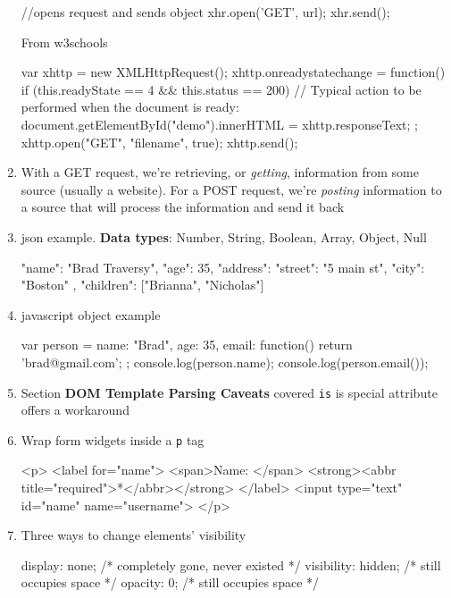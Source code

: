 \documentclass[a4paper,12pt]{article}
\begin{document}
\begin{enumerate}
\begin{jscode}
//opens request and sends object
xhr.open('GET', url);
xhr.send();
\end{jscode}
From w3schools
\begin{jscode}
var xhttp = new XMLHttpRequest();
xhttp.onreadystatechange = function() {
    if (this.readyState == 4 && this.status == 200) {
       // Typical action to be performed when the document is ready:
       document.getElementById("demo").innerHTML = xhttp.responseText;
    }
};
xhttp.open("GET", "filename", true);
xhttp.send();
\end{jscode}

\item With a GET request, we're retrieving, or \textit{getting}, information from some source (usually a website). For a POST request, we're \textit{posting} information to a source that will process the information and send it back

\item json example. \textbf{Data types}: Number, String, Boolean, Array, Object, Null
\begin{jscode}
{
	"name": "Brad Traversy",
	"age": 35,
	"address": {
		"street": "5 main st",
		"city": "Boston"
	},
	"children": ["Brianna", "Nicholas"]
}
\end{jscode}

\item javascript object example
\begin{jscode}
var person = {
  name: "Brad",
  age: 35,
  email: function(){
    return 'brad@gmail.com';
  }
};
console.log(person.name);
console.log(person.email());
\end{jscode}

\item Section \textbf{DOM Template Parsing Caveats} covered \verb|is| is special attribute offers a workaround

\item Wrap form widgets inside a \verb|p| tag
\begin{htmlcode}
<p>
  <label for="name">
    <span>Name: </span>
    <strong><abbr title="required">*</abbr></strong>
  </label>
  <input type="text" id="name" name="username">
</p>
\end{htmlcode}

\item Three ways to change elements' visibility
\begin{htmlcode}
display: none; /* completely gone, never existed */
visibility: hidden; /* still occupies space */
opacity: 0; /* still occupies space */
\end{htmlcode}


\end{enumerate}
\end{document}
